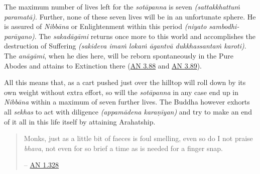 The maximum number of lives left for the \emph{sotāpanna} is seven \emph{(sattakkhattuṁ paramatā)}. Further, none of these seven lives will be in an unfortunate sphere. He is assured of \emph{Nibbāna} or Enlightenment within this period \emph{(niyato sambodhi-parāyano)}. The \emph{sakadāgāmi} returns once more to this world and accomplishes the destruction of Suffering \emph{(sakideva imaṁ lokaṁ āgantvā dukkhassantaṁ karoti)}. The \emph{anāgāmi}, when he dies here, will be reborn spontaneously in the Pure Abodes and attains to Extinction there (\href{https://suttacentral.net/an3.88/en/sujato}{AN 3.88} and \href{https://suttacentral.net/an3.89/en/sujato}{AN 3.89}).

All this means that, as a cart pushed just over the hilltop will roll down by its own weight without extra effort, so will the \emph{sotāpanna} in any case end up in \emph{Nibbāna} within a maximum of seven further lives. The Buddha however exhorts all \emph{sekhas} to act with diligence \emph{(appamādena karaṇīyan)} and try to make an end of it all in this life itself by attaining Arahatship.

\bigskip

\begin{quote}
Monks, just as a little bit of faeces is foul smelling, even so do I not praise \emph{bhava}, not even for so brief a time as is needed for a finger snap.

 -- \href{https://suttacentral.net/an1.316-332/en/sujato}{AN 1.328}
\end{quote}
